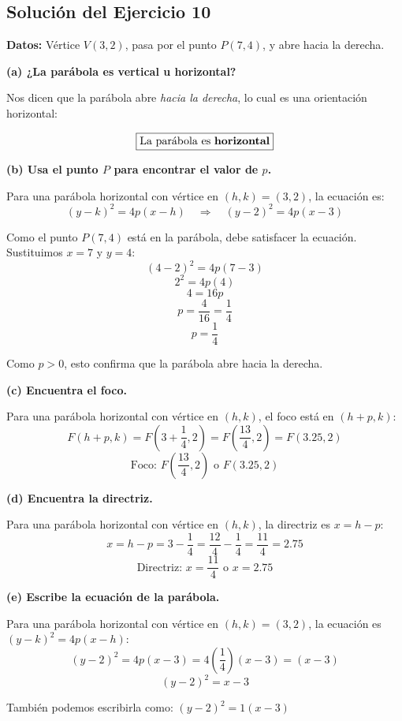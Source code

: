 \documentclass[12pt,a4paper]{article}
\begin{document}

	\subsection*{Solución del Ejercicio 10}

	\textbf{Datos:} Vértice \(V(3,2)\), pasa por el punto \(P(7,4)\), y abre hacia la derecha.

	\bigskip

	\textbf{(a) ¿La parábola es vertical u horizontal?}

	Nos dicen que la parábola abre \emph{hacia la derecha}, lo cual es una orientación horizontal:

	\[
	\boxed{\text{La parábola es \textbf{horizontal}}}
	\]

	\textbf{(b) Usa el punto \(P\) para encontrar el valor de \(p\).}

	Para una parábola horizontal con vértice en \((h,k)=(3,2)\), la ecuación es:
	\[
	(y-k)^2=4p(x-h) \quad\Rightarrow\quad (y-2)^2=4p(x-3)
	\]

	Como el punto \(P(7,4)\) está en la parábola, debe satisfacer la ecuación. Sustituimos \(x=7\) y \(y=4\):
	\[
	(4-2)^2=4p(7-3)
	\]
	\[
	2^2=4p(4)
	\]
	\[
	4=16p
	\]
	\[
	p=\frac{4}{16}=\frac{1}{4}
	\]
	\[
	\boxed{p=\frac{1}{4}}
	\]

	Como \(p>0\), esto confirma que la parábola abre hacia la derecha.

	\textbf{(c) Encuentra el foco.}

	Para una parábola horizontal con vértice en \((h,k)\), el foco está en \((h+p,k)\):
	\[
	F(h+p,k)=F\left(3+\frac{1}{4},2\right)=F\left(\frac{13}{4},2\right)=F(3.25,2)
	\]
	\[
	\boxed{\text{Foco: } F\left(\frac{13}{4},2\right) \text{ o } F(3.25,2)}
	\]

	\textbf{(d) Encuentra la directriz.}

	Para una parábola horizontal con vértice en \((h,k)\), la directriz es \(x=h-p\):
	\[
	x=h-p=3-\frac{1}{4}=\frac{12}{4}-\frac{1}{4}=\frac{11}{4}=2.75
	\]
	\[
	\boxed{\text{Directriz: } x=\frac{11}{4} \text{ o } x=2.75}
	\]

	\textbf{(e) Escribe la ecuación de la parábola.}

	Para una parábola horizontal con vértice en \((h,k)=(3,2)\), la ecuación es \((y-k)^2=4p(x-h)\):
	\[
	(y-2)^2=4p(x-3)=4\left(\frac{1}{4}\right)(x-3)=(x-3)
	\]
	\[
	\boxed{(y-2)^2=x-3}
	\]

	También podemos escribirla como: \((y-2)^2=1(x-3)\)
\end{document}
